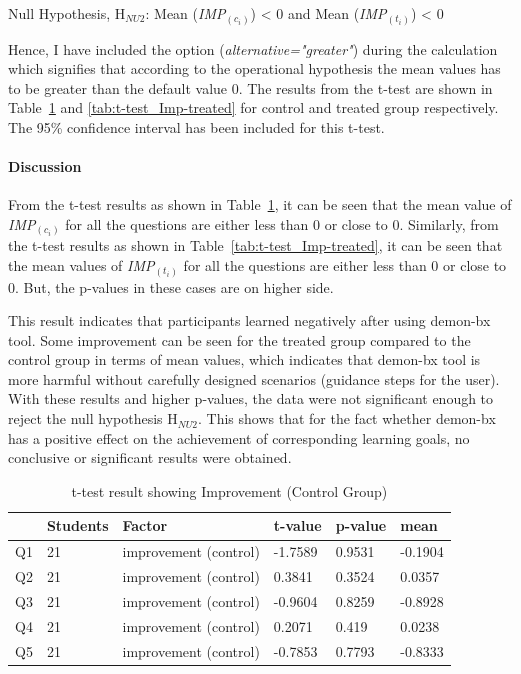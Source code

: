 Null Hypothesis, {H$_{NU2}$}: 
Mean (\textit{IMP$_{(c_i)}$}) < 0 and Mean (\textit{IMP$_{(t_i)}$}) < 0

Hence, I have included the option (\textit{alternative="greater"}) during the calculation which signifies that according to the operational hypothesis the mean values has to be greater than the default value 0. The results from the t-test are shown in Table~\ref{tab:t-test_Imp-control} and \ref{tab:t-test_Imp-treated} for control and treated group respectively. The 95\% confidence interval has been included for this t-test.

\paragraph{Discussion}
From the t-test results as shown in Table~\ref{tab:t-test_Imp-control}, it can be seen that the mean value of \textit{IMP$_{(c_i)}$} for all the questions are either less than 0 or close to 0.
Similarly, from the t-test results as shown in Table~\ref{tab:t-test_Imp-treated}, it can be seen that the mean values of \textit{IMP$_{(t_i)}$} for all the questions are either less than 0 or close to 0. But, the p-values in these cases are on higher side. 

This result indicates that participants learned negatively after using demon-bx tool. 
Some improvement can be seen for the treated group compared to the control group in terms of mean values, which indicates that demon-bx tool is more harmful without carefully designed scenarios (guidance steps for the user). With these results and higher p-values, the data were not significant enough to reject the null hypothesis {H$_{NU2}$}. This shows that for the fact whether demon-bx has a positive effect on the achievement of corresponding learning goals, no conclusive or significant results were obtained.

\begin{table}[ht]
	\centering	
	\begin{tabular}{|p{1cm}|p{1.5cm}|p{4.5cm}|p{1.5cm}|p{1.5cm}|p{1.5cm}|}
		\hline
		\rowcolor[gray]{.8}	
		\textbf{} & \textbf{Students} & \textbf{Factor} & \textbf{t-value} & \textbf{p-value} & \textbf{mean}\\
		\hline
		Q1 & 21 & improvement (control) &  -1.7589 & 0.9531 & -0.1904\\
		\hline
		Q2 & 21 & improvement (control) & 0.3841 & 0.3524 & 0.0357\\
		\hline
		Q3 & 21 & improvement (control) & -0.9604 & 0.8259 & -0.8928\\
		\hline	
		Q4 & 21 & improvement (control) & 0.2071 & 0.419 & 0.0238\\
		\hline
		Q5 & 21 & improvement (control) & -0.7853 & 0.7793 & -0.8333\\
		\hline			
	\end{tabular}
	\caption{t-test result showing Improvement (Control Group)}
	\label{tab:t-test_Imp-control}
\end{table}


